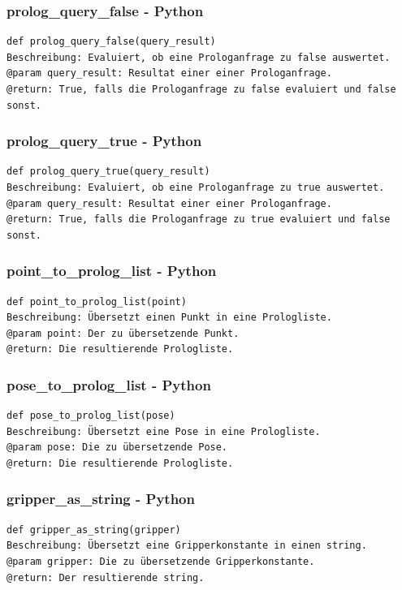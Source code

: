 \documentclass{suturo}
\begin{document}
\subsubsection{prolog\_query\_false - Python}
\begin{verbatim}
def prolog_query_false(query_result)
Beschreibung: Evaluiert, ob eine Prologanfrage zu false auswertet.
@param query_result: Resultat einer einer Prologanfrage.
@return: True, falls die Prologanfrage zu false evaluiert und false sonst.
\end{verbatim}

\subsubsection{prolog\_query\_true - Python}
\begin{verbatim}
def prolog_query_true(query_result)
Beschreibung: Evaluiert, ob eine Prologanfrage zu true auswertet.
@param query_result: Resultat einer einer Prologanfrage.
@return: True, falls die Prologanfrage zu true evaluiert und false sonst.
\end{verbatim}

\subsubsection{point\_to\_prolog\_list - Python}
\begin{verbatim}
def point_to_prolog_list(point)
Beschreibung: Übersetzt einen Punkt in eine Prologliste.
@param point: Der zu übersetzende Punkt.
@return: Die resultierende Prologliste.
\end{verbatim}

\subsubsection{pose\_to\_prolog\_list - Python}
\begin{verbatim}
def pose_to_prolog_list(pose)
Beschreibung: Übersetzt eine Pose in eine Prologliste.
@param pose: Die zu übersetzende Pose.
@return: Die resultierende Prologliste.
\end{verbatim}

\subsubsection{gripper\_as\_string - Python}
\begin{verbatim}
def gripper_as_string(gripper)
Beschreibung: Übersetzt eine Gripperkonstante in einen string.
@param gripper: Die zu übersetzende Gripperkonstante.
@return: Der resultierende string.
\end{verbatim}
\end{document}

